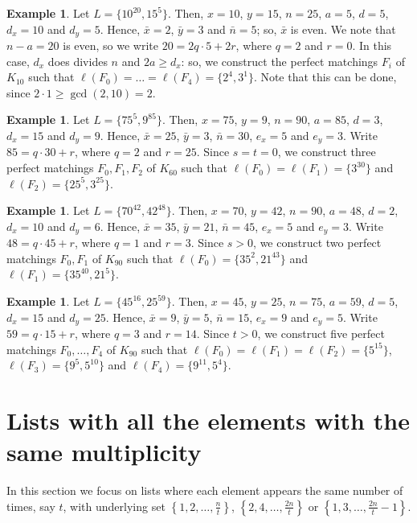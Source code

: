 \documentclass{amsart}
\theoremstyle{definition}
\newtheorem{ex}[defi]{Example}
\numberwithin{equation}{section}
\begin{document}
\begin{ex}
Let $L=\{10^{20}, 15^{5}\}$. Then, $x=10$, $y=15$, $n=25$, $a=5$, $d=5$, $d_x=10$ and $d_y=5$.
Hence, $\bar x=2$, $\bar y=3$ and $\bar n=5$; so, $\bar x$ is even.
We note that $n-a=20$ is even, so we write $20 = 2q\cdot 5 + 2r$, where $q=2$ and $r=0$.
In this case, $d_x$ does divides $n$ and $2a\geq d_x$: so, 
we construct the perfect matchings $F_i$ of $K_{10}$ such that 
$\ell(F_0)=\ldots=\ell(F_4)=\{2^4, 3^1\}$. Note that this can be done, since $2\cdot 1\geq \gcd(2,10)=2$.
\end{ex}

\begin{ex}
Let $L=\{75^{5}, 9^{85}\}$. Then, $x=75$, $y=9$, $n=90$, $a=85$, $d=3$, 
$d_x=15$ and $d_y=9$. Hence, $\bar x=25$, $\bar y=3$, $\bar n=30$, $e_x=5$ and  $e_y=3$.
Write $85 = q\cdot 30 + r$, where $q=2$ and $r=25$.
Since  $s=t=0$, we construct three perfect matchings $F_0,F_1,F_2$ of $K_{60}$ such that
$\ell(F_0)=\ell(F_1)=\{3^{30}\}$ and $\ell(F_2)=\{25^{5}, 3^{25}\}$.
\end{ex}



\begin{ex}
Let $L=\{70^{42}, 42^{48}\}$. Then, $x=70$, $y=42$, $n=90$, $a=48$, $d=2$, 
$d_x=10$ and $d_y=6$.
Hence, $\bar x=35$, $\bar y=21$, $\bar n=45$, $e_x=5$ and  $e_y=3$.
Write $48 = q\cdot 45 + r$, where $q=1$ and $r=3$.
Since  $s>0$, we construct two perfect matchings $F_0,F_1$ of $K_{90}$ such that
$\ell(F_0)=\{35^{2}, 21^{43}\}$  and $\ell(F_1)=\{35^{40} , 21^{5}\}$.
\end{ex}


\begin{ex}
Let $L=\{45^{16}, 25^{59}\}$. Then, $x=45$, $y=25$, $n=75$, $a=59$, $d=5$, 
$d_x=15$ and $d_y=25$. Hence, $\bar x=9$, $\bar y=5$, $\bar n=15$, $e_x=9$ and $e_y=5$.
Write $59 = q\cdot 15 + r$, where $q=3$ and $r=14$.
Since $t>0$, we construct 
five perfect matchings $F_0,\ldots,F_4$ of $K_{90}$ such that
$\ell(F_0)=\ell(F_1)=\ell(F_2)=\{5^{15}\}$, $\ell(F_3)=\{ 9^{5}, 5^{10  }\}$ and
$\ell(F_4)=\{9^{11},  5^{4}\}$.
\end{ex}


\section{Lists with all the elements with the same multiplicity}\label{sec:246}

In this section we focus on lists where each element appears the same number of times, say $t$, with underlying set
$\left\{1,2,\ldots,\frac{n}{t}\right\}$, $\left\{2,4,\ldots,\frac{2n}{t}\right\}$ or $\left\{1,3,\ldots,\frac{2n}{t}-1\right\}$.
\end{document}
